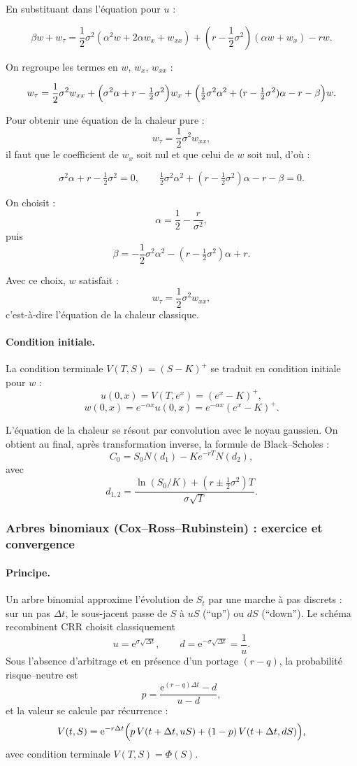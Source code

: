 \documentclass[11pt,a4paper]{article}
\newcommand{\ee}{\mathrm{e}}
\newcommand{\1}{\mathbf{1}}
\begin{document}
En substituant dans l'\'equation pour $u$ :

\[
\beta w + w_\tau
=
\frac12 \sigma^2(\alpha^2 w + 2\alpha w_x + w_{xx})
+ \left(r - \frac12 \sigma^2\right)(\alpha w + w_x) - r w.
\]

On regroupe les termes en $w$, $w_x$, $w_{xx}$ :

\[
w_\tau
=
\frac12 \sigma^2 w_{xx}
+
\Bigl( \sigma^2 \alpha + r - \tfrac12\sigma^2 \Bigr) w_x
+
\Bigl( \tfrac12 \sigma^2\alpha^2 + (r - \tfrac12\sigma^2)\alpha - r - \beta \Bigr) w.
\]

Pour obtenir une \'equation de la chaleur pure :
\[
w_\tau = \frac12 \sigma^2 w_{xx},
\]
il faut que le coefficient de $w_x$ soit nul et que celui de $w$ soit nul, d'o\`u :

\[
\sigma^2 \alpha + r - \tfrac12 \sigma^2 = 0,
\qquad
\tfrac12 \sigma^2\alpha^2 + (r - \tfrac12\sigma^2)\alpha - r - \beta = 0.
\]

On choisit :
\[
\alpha = \frac12 - \frac{r}{\sigma^2},
\]
puis
\[
\beta = -\frac12 \sigma^2 \alpha^2 - (r - \tfrac12\sigma^2)\alpha + r.
\]

Avec ce choix, $w$ satisfait :
\[
w_\tau = \frac12 \sigma^2 w_{xx},
\]
c'est-à-dire l'\'equation de la chaleur classique.

\paragraph{Condition initiale.}

La condition terminale $V(T,S) = (S-K)^+$ se traduit en condition initiale pour $w$ :
\[
u(0,x) = V(T,e^x) = (e^x - K)^+,
\]
\[
w(0,x) = e^{-\alpha x} u(0,x)
= e^{-\alpha x} (e^x - K)^+.
\]

L'\'equation de la chaleur se r\'esout par convolution avec le noyau gaussien.
On obtient au final, apr\`es transformation inverse, la formule de Black--Scholes :
\[
C_0 = S_0 N(d_1) - K e^{-rT} N(d_2),
\]
avec
\[
d_{1,2} =
\frac{\ln(S_0/K) + (r \pm \tfrac12 \sigma^2)T}{\sigma \sqrt{T}}.
\]

\subsubsection{Arbres binomiaux (Cox--Ross--Rubinstein) : exercice et convergence}

\paragraph{Principe.}
Un arbre binomial approxime l'\'evolution de $S_t$ par une marche \`a pas discrets : sur un pas $\Delta t$,
le sous-jacent passe de $S$ \`a $uS$ (``up'') ou $dS$ (``down''). Le sch\'ema recombinent CRR choisit classiquement
\[
u=\ee^{\sigma\sqrt{\Delta t}},\qquad d=\ee^{-\sigma\sqrt{\Delta t}}=\frac{1}{u}.
\]
Sous l'absence d'arbitrage et en pr\'esence d'un portage $(r-q)$, la probabilit\'e risque--neutre est
\[
p=\frac{\ee^{(r-q)\Delta t}-d}{u-d},
\]
et la valeur se calcule par r\'ecurrence :
\[
V(t,S)=\ee^{-r\Delta t}\Bigl(p\,V(t+\Delta t,uS)+(1-p)\,V(t+\Delta t,dS)\Bigr),
\]
avec condition terminale $V(T,S)=\Phi(S)$.
\end{document}
